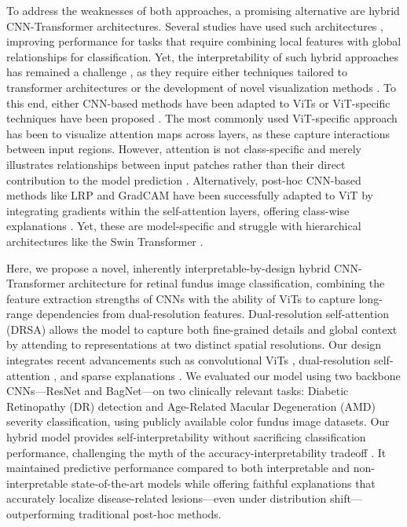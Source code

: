 \documentclass[runningheads]{llncs}
\begin{document}
    To address the weaknesses of both approaches, a promising alternative are hybrid CNN-Transformer architectures. Several studies have used such architectures \cite{ilyas2024hybrid, kim2025systematic, mauricio2023comparing, takahashi2024comparison}, improving performance for tasks that require combining local features with global relationships for classification. Yet, the interpretability of such hybrid approaches has remained a challenge \cite{kim2025systematic, mauricio2023comparing, takahashi2024comparison}, as they require either techniques tailored to transformer architectures or the development of novel visualization methods \cite{kim2025systematic}. To this end, either CNN-based methods have been adapted to ViTs \cite{selvaraju2017grad, bach2015pixel} or ViT-specific techniques have been proposed \cite{abnar2020quantifying, chefer2021generic, chefer2021transformer}. The most commonly used ViT-specific approach has been to visualize attention maps across layers, as these capture interactions between input regions. However, attention is not class-specific and merely illustrates relationships between input patches rather than their direct contribution to the model prediction \cite{bibal2022attention, stassin2023explainability, kashefi2023explainability}.
    Alternatively, post-hoc CNN-based methods like LRP \cite{bach2015pixel} and GradCAM \cite{selvaraju2017grad} have been successfully adapted to ViT by integrating gradients within the self-attention layers, offering class-wise explanations \cite{chefer2021transformer}. Yet, these are model-specific and struggle with hierarchical architectures like the Swin Transformer \cite{nguyen2023inspecting}. 

    Here, we propose a novel, inherently interpretable-by-design hybrid CNN-Transformer architecture for retinal fundus image classification, combining the feature extraction strengths of CNNs with the ability of ViTs to capture long-range dependencies from dual-resolution features. Dual-resolution self-attention (DRSA) allows the model to capture both fine-grained details and global context by attending to representations at two distinct spatial resolutions. Our design integrates recent advancements such as convolutional ViTs \cite{wu2021cvt}, dual-resolution self-attention \cite{ilyas2024hybrid}, and sparse explanations \cite{donteu2023sparse, djoumessi2025soft}. We evaluated our model using two backbone CNNs---ResNet and BagNet---on two clinically relevant tasks: Diabetic Retinopathy (DR) detection and Age-Related Macular Degeneration (AMD) severity classification, using publicly available color fundus image datasets.     
    Our hybrid model provides self-interpretability without sacrificing classification performance, challenging the myth of the accuracy-interpretability tradeoff \cite{rudin2019stop}. 
    It maintained predictive performance compared to both interpretable and non-interpretable state-of-the-art models while offering faithful explanations that accurately localize disease-related lesions---even under distribution shift---outperforming traditional post-hoc methods.
\end{document}
